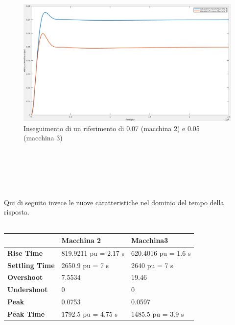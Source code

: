 \documentclass[Lau,noexaminfo]{sapthesis}
\begin{document}
	\begin{figure}[h]
		\centering
		\includegraphics[scale=0.26]{simulazione_riferimento_nuovo}
		\caption{Inseguimento di un riferimento di 0.07 (macchina 2) e 0.05 (macchina 3)}
	\end{figure}
\\\\\\\\\\
	Qui di seguito invece le nuove caratteristiche nel dominio del tempo della risposta.\\\\
	\begin{tabular}{|l|l|l|}
		\hline
		& \textbf{Macchina 2}	& \textbf{Macchina3}\\
		\hline
		\textbf{Rise Time} & 819.9211 pu = 2.17 s & 620.4016 pu = 1.6 s\\
		\textbf{Settling Time} & 2650.9 pu = 7 s & 2640 pu = 7 s\\
		\textbf{Overshoot} & 7.5534 & 19.46\\
		\textbf{Undershoot} & 0 & 0\\
		\textbf{Peak} & 0.0753 & 0.0597\\
		\textbf{Peak Time} & 1792.5 pu = 4.75 s & 1485.5 pu = 3.9 s\\
		\hline
	\end{tabular}
\end{document}
